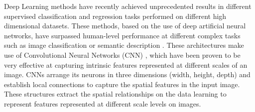 \documentclass[twocol]{ametsoc}
\begin{document}



Deep Learning \citep{lecun2015deep} methods have recently achieved unprecedented results in different supervised classification and regression tasks performed on different high dimensional datasets. These methods, based on the use of deep artificial neural networks, have surpassed human-level performance at different complex tasks such as image classification \citep{krizhevsky2012imagenet} or semantic description \citep{karpathy2015deep}. These architectures make use of Convolutional Neural Networks (CNN) \citep{krizhevsky2012imagenet}, which have been proven to be very effective at capturing intrinsic features represented at different scales of an image. CNNs arrange its neurons in three dimensions (width, height, depth) and establish local connections to capture the spatial features in the input image. These structures extract the spatial relationships on the data learning to represent features represented at different scale levels on images.
\end{document}
